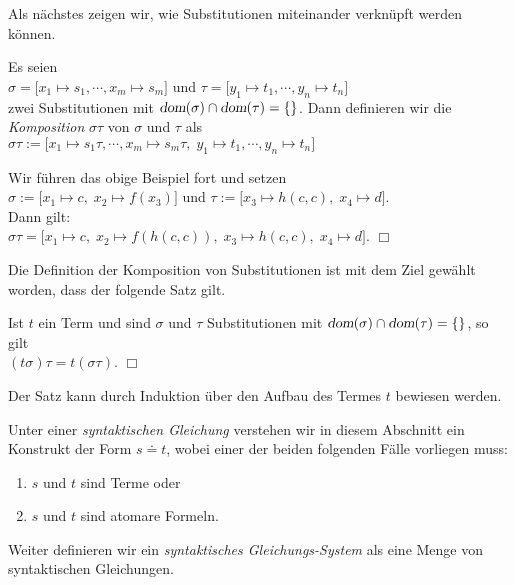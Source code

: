 \noindent
Als n\"{a}chstes zeigen wir, wie  Substitutionen miteinander verkn\"{u}pft werden k\"{o}nnen.
\begin{Definition} 
    Es seien\\[0.2cm]
    \hspace*{1.3cm}  $\sigma = \big[ x_1 \mapsto s_1, \cdots, x_m \mapsto s_m \big]$ \quad und \quad  $\tau = \big[ y_1 \mapsto t_1, \cdots, y_n \mapsto t_n \big]$ \\[0.2cm]
    zwei Substitutionen mit $\textsl{dom}(\sigma) \cap \textsl{dom}(\tau) = \{\}$. Dann definieren
    wir die {\emph{\color{blue}Komposition}} $\sigma\tau$ von $\sigma$ und $\tau$ als \\[0.2cm]
    \hspace*{1.3cm} $\sigma\tau := \big[ x_1 \mapsto s_1\tau, \cdots, x_m \mapsto s_m\tau,\; y_1 \mapsto t_1, \cdots, y_n \mapsto t_n \big]$
    \eox
\end{Definition}

\example
Wir f\"{u}hren das obige Beispiel fort und setzen \\[0.2cm]
\hspace*{1.3cm} $\sigma := \big[ x_1 \mapsto c,\; x_2 \mapsto f(x_3) \big]$
                \quad und \quad $\tau := \big[ x_3 \mapsto h(c,c),\; x_4 \mapsto d \big]$. \\[0.2cm]
Dann gilt: \\[0.2cm]
\hspace*{1.3cm} $ \sigma\tau = \big[ x_1 \mapsto c,\; x_2 \mapsto f(h(c,c)),\; x_3 \mapsto h(c,c),\;x_4 \mapsto d \big]$.
\hspace*{\fill} $\Box$
\vspace{0.3cm}

\noindent
Die Definition der Komposition von Substitutionen ist mit dem Ziel gew\"{a}hlt worden, dass
der folgende Satz gilt.
\begin{Satz} \label{satz:komposition}
    Ist $t$ ein Term und sind $\sigma$ und $\tau$ Substitutionen mit 
    $\textsl{dom}(\sigma) \cap \textsl{dom}(\tau) = \{\}$, so gilt \\[0.2cm]
    \hspace*{1.3cm} $(t \sigma)\tau = t (\sigma\tau)$.
    \hspace*{\fill} $\Box$
\end{Satz}
Der Satz kann durch Induktion \"{u}ber den Aufbau des Termes $t$ bewiesen werden.


\begin{Definition}
Unter einer {\emph{\color{blue}syntaktischen Gleichung}} verstehen wir in diesem Abschnitt ein Konstrukt der Form
$s \doteq t$, wobei einer der beiden folgenden F\"{a}lle vorliegen muss:
\begin{enumerate}
\item $s$ und $t$ sind Terme  oder
\item $s$ und $t$ sind atomare Formeln.
\end{enumerate}
Weiter definieren wir ein {\emph{\color{blue}syntaktisches Gleichungs-System}} als eine Menge
von syntaktischen Gleichungen.
\eox
\end{Definition}

